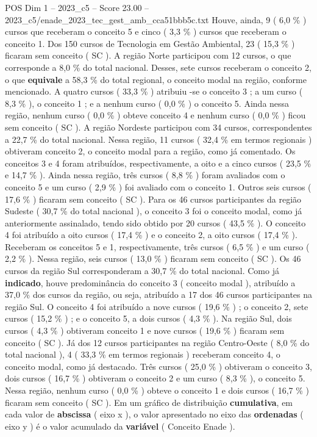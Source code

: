 \begin{textsample}{POS Dim 1 – 2023\_c5 – Score 23.00 – 2023\_c5/enade\_2023\_tec\_gest\_amb\_cca51bbb5c.txt}
Houve, ainda, 9 ( 6,0 \% ) cursos que receberam o conceito 5 e cinco ( 3,3 \% ) cursos que receberam o conceito 1.
Dos 150 cursos de Tecnologia em Gestão Ambiental, 23 ( 15,3 \% ) ficaram sem conceito ( SC ).
A região Norte participou com 12 cursos, o que corresponde a 8,0 \% do total nacional.
Desses, sete cursos receberam o conceito 2, o que \textbf{equivale} a 58,3 \% do total regional, o conceito modal na região, conforme mencionado.
A quatro cursos ( 33,3 \% ) atribuiu -se o conceito 3 ; a um curso ( 8,3 \% ), o conceito 1 ; e a nenhum curso ( 0,0 \% ) o conceito 5.
Ainda nessa região, nenhum curso ( 0,0 \% ) obteve conceito 4 e nenhum curso ( 0,0 \% ) ficou sem conceito ( SC ).
A região Nordeste participou com 34 cursos, correspondentes a 22,7 \% do total nacional.
Nessa região, 11 cursos ( 32,4 \% em termos regionais ) obtiveram conceito 2, o conceito modal para a região, como já comentado.
Os conceitos 3 e 4 foram atribuídos, respectivamente, a oito e a cinco cursos ( 23,5 \% e 14,7 \% ).
Ainda nessa região, três cursos ( 8,8 \% ) foram avaliados com o conceito 5 e um curso ( 2,9 \% ) foi avaliado com o conceito 1.
Outros seis cursos ( 17,6 \% ) ficaram sem conceito ( SC ).
Para os 46 cursos participantes da região Sudeste ( 30,7 \% do total nacional ), o conceito 3 foi o conceito modal, como já anteriormente assinalado, tendo sido obtido por 20 cursos ( 43,5 \% ).
O conceito 4 foi atribuído a oito cursos ( 17,4 \% ) e o conceito 2, a oito cursos ( 17,4 \% ).
Receberam os conceitos 5 e 1, respectivamente, três cursos ( 6,5 \% ) e um curso ( 2,2 \% ).
Nessa região, seis cursos ( 13,0 \% ) ficaram sem conceito ( SC ).
Os 46 cursos da região Sul corresponderam a 30,7 \% do total nacional.
Como já \textbf{indicado}, houve predominância do conceito 3 ( conceito modal ), atribuído a 37,0 \% dos cursos da região, ou seja, atribuído a 17 dos 46 cursos participantes na região Sul.
O conceito 4 foi atribuído a nove cursos ( 19,6 \% ) ; o conceito 2, sete cursos ( 15,2 \% ) ; e o conceito 5, a dois cursos ( 4,3 \% ).
Na região Sul, dois cursos ( 4,3 \% ) obtiveram conceito 1 e nove cursos ( 19,6 \% ) ficaram sem conceito ( SC ).
Já dos 12 cursos participantes na região Centro-Oeste ( 8,0 \% do total nacional ), 4 ( 33,3 \% em termos regionais ) receberam conceito 4, o conceito modal, como já destacado.
Três cursos ( 25,0 \% ) obtiveram o conceito 3, dois cursos ( 16,7 \% ) obtiveram o conceito 2 e um curso ( 8,3 \% ), o conceito 5.
Nessa região, nenhum curso ( 0,0 \% ) obteve o conceito 1 e dois cursos ( 16,7 \% ) ficaram sem conceito ( SC ).
Em um gráfico de distribuição \textbf{cumulativa}, em cada valor de \textbf{abscissa} ( eixo x ), o valor apresentado no eixo das \textbf{ordenadas} ( eixo y ) é o valor acumulado da \textbf{variável} ( Conceito Enade ).

\end{textsample}
